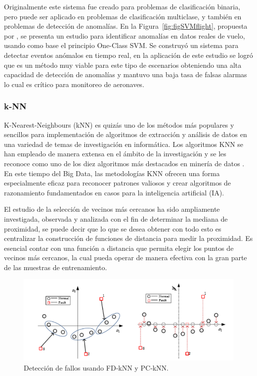 \documentclass[11pt,a4paper,spanish]{book}
\numberwithin{equation}{chapter}
\numberwithin{figure}{chapter}
\begin{document}
Originalmente este sistema fue creado para problemas de clasificación binaria, pero puede ser aplicado en problemas de clasificación multiclase, y también en problemas de detección de anomalías. En la Figura~\ref{fig:figSVMflight}, propuesta por \cite{qin2022flight}, se presenta un estudio para identificar anomalías en datos reales de vuelo, usando como base el principio One-Class SVM. Se construyó un sistema para detectar eventos anómalos en tiempo real, en la aplicación de este estudio se logró que es un método muy viable para este tipo de escenarios obteniendo una alta capacidad de detección de anomalías y mantuvo una baja tasa de falsas alarmas lo cual es crítico para monitoreo de aeronaves.


\subsubsection{k-NN}


K-Nearest-Neighbours (kNN) es quizás uno de los métodos más populares y sencillos para implementación de algoritmos de extracción y análisis de datos en una variedad de temas de investigación en informática. Los algoritmos KNN se han empleado de manera extensa en el ámbito de la investigación y se les reconoce como uno de los diez algoritmos más destacados en minería de datos \cite{witten2005data}. En este tiempo del Big Data, las metodologías KNN ofrecen una forma especialmente eficaz para reconocer patrones valiosos y crear algoritmos de razonamiento fundamentados en casos para la inteligencia artificial (IA). \cite{wu2008top}


El estudio de la selección de vecinos más cercanos ha sido ampliamente investigada, observada y analizada con el fin de determinar la mediana de proximidad, se puede decir que lo que se desea obtener con todo esto es centralizar la construcción de funciones de distancia para medir la proximidad. Es esencial contar con una función a distancia que permita elegir los puntos de vecinos más cercanos, la cual pueda operar de manera efectiva con la gran parte de las muestras de entrenamiento. \cite{zhang2022influence}

\begin{figure}[h]
    \centering
    \includegraphics[width=1.0\textwidth]{media/knn-zhou.png}
    \caption{Detección de fallos usando FD‑kNN y PC‑kNN.  \protect\cite{zhou2015faultdetection} }
    \label{fig:figKnnZhou}
\end{figure}
\end{document}
